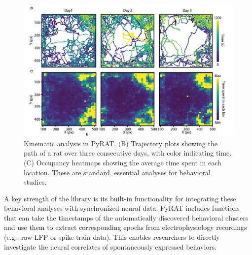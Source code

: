 \begin{figure}[H]
    \centering
    \includegraphics[width=\textwidth]{archivos/figuras/pyrat_1bc.jpg} 
    \caption{Kinematic analysis in PyRAT. (B) Trajectory plots showing the path of a rat over three consecutive days, with color indicating time. (C) Occupancy heatmaps showing the average time spent in each location. These are standard, essential analyses for behavioral studies.}
    \label{fig:kinematics}
\end{figure}

A key strength of the library is its built-in functionality for integrating these behavioral analyses with synchronized neural data. PyRAT includes functions that can take the timestamps of the automatically discovered behavioral clusters and use them to extract corresponding epochs from electrophysiology recordings (e.g., raw LFP or spike train data). This enables researchers to directly investigate the neural correlates of spontaneously expressed behaviors.


